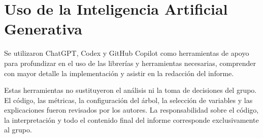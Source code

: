 \chapter{Uso de la Inteligencia Artificial Generativa} \label{chp:use-of-generative-ai}


Se utilizaron ChatGPT, Codex y GitHub Copilot como herramientas de apoyo para
profundizar en el uso de las librerías y herramientas necesarias, comprender
con mayor detalle la implementación y asistir en la redacción del informe.

Estas herramientas no sustituyeron el análisis ni la toma de decisiones del
grupo. El código, las métricas, la configuración del árbol, la selección de
variables y las explicaciones fueron revisados por los autores. La
responsabilidad sobre el código, la interpretación y todo el contenido final
del informe corresponde exclusivamente al grupo.
